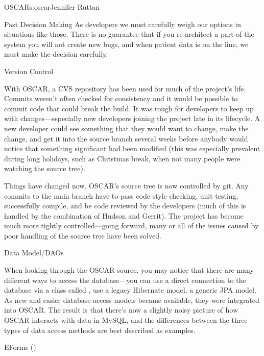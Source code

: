 \begin{aosachapter}{OSCAR}{s:oscar}{Jennifer Ruttan}
\begin{aosasect1}{Past Decision Making}
As developers we must carefully weigh our options in situations like
those. There is no guarantee that if you re-architect a part of the
system you will not create new bugs, and when patient data is on the
line, we must make the decision carefully.

\end{aosasect1}

\begin{aosasect1}{Version Control}

With OSCAR, a CVS repository has been used for much of the project's
life. Commits weren't often checked for consistency and it would be
possible to commit code that could break the build. It was tough for
developers to keep up with changes---especially new developers joining
the project late in its lifecycle. A new developer could see something
that they would want to change, make the change, and get it into the
source branch several weeks before anybody would notice that something
significant had been modified (this was especially prevalent during
long holidays, such as Christmas break, when not many people were
watching the source tree).

Things have changed now. OSCAR's source tree is now controlled by
git. Any commits to the main branch have to pass code style checking,
unit testing, successfully compile, and be code reviewed by the
developers (much of this is handled by the combination of Hudson and
Gerrit). The project has become much more tightly controlled---going
forward, many or all of the issues caused by poor handling of the
source tree have been solved.

\end{aosasect1}

\begin{aosasect1}{Data Model/DAOs}

When looking through the OSCAR source, you may notice that there are
many different ways to access the database---you can use a direct
connection to the database via a class called , use a
legacy Hibernate model, a generic JPA model. As new and easier
database access models became available, they were integrated into
OSCAR. The result is that there's now a slightly noisy picture of how
OSCAR interacts with data in MySQL, and the differences between the
three types of data access methods are best described as examples.

\end{aosasect1}

\begin{aosasect1}{EForms ()}


\end{aosasect1}
\end{aosachapter}
